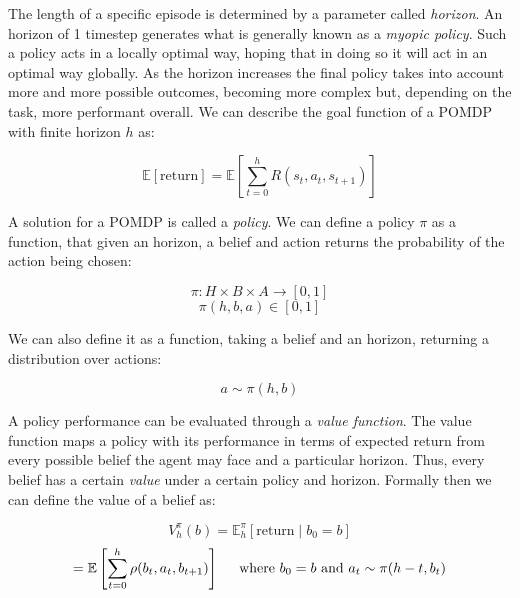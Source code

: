 The length of a specific episode is determined by a parameter called \textit{horizon}. An horizon of
1 timestep generates what is generally known as a \textit{myopic policy}. Such a policy acts in a
locally optimal way, hoping that in doing so it will act in an optimal way globally. As the horizon
increases the final policy takes into account more and more possible outcomes, becoming more complex
but, depending on the task, more performant overall. We can describe the goal function of a POMDP
with finite horizon $h$ as:

\begin{equation}
 \mathbb{E}[\text{return}] = \mathbb{E} \left [ \sum_{t=0}^{h} R(s_t, a_t, s_{t+1}) \right ]
\end{equation}

A solution for a POMDP is called a \textit{policy}. We can define a policy $\pi$ as a function, that
given an horizon, a belief and action returns the probability of the action being chosen:

\begin{equation}
 \pi : H \times B \times A \rightarrow [0,1]
\end{equation}
\begin{equation}
 \pi(h, b, a) \in [0,1]
\end{equation}

We can also define it as a function, taking a belief and an horizon, returning a distribution over
actions:

\begin{equation}
 a \sim \pi(h, b)
\end{equation}

A policy performance can be evaluated through a \textit{value function}. The value function maps a
policy with its performance in terms of expected return from every possible belief the agent may
face and a particular horizon. Thus, every belief has a certain \textit{value} under a certain
policy and horizon. Formally then we can define the value of a belief as:

\begin{equation}
 V^\pi_{h}(b) = \mathbb{E}^\pi_h \left [\text{return} \mid b_0 = b \right ]
\end{equation}
\begin{equation}
 = \mathbb{E} \left [\sum_{t=0}^{h} \rho(b_{t}, a_t, b_{t+1}) \right ]
    \hspace{0.5cm}\text{where }b_0 = b \text{ and }a_t \sim \pi(h-t, b_t)
\end{equation}

